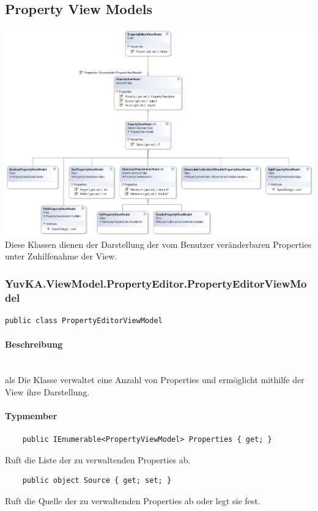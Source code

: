\subsection{Property View Models}


\includegraphics[width=\textwidth]{YuvKA.ViewModel.PropertyEditor/propertyEditor.png}
Diese Klassen dienen der Darstellung der vom Benutzer veränderbaren Properties unter Zuhilfenahme der View. 



\subsubsection{YuvKA.ViewModel.PropertyEditor.PropertyEditorViewModel}

\begin{verbatim}
public class PropertyEditorViewModel
\end{verbatim}

\paragraph{Beschreibung}~\\als
Die Klasse  verwaltet eine Anzahl von Properties und ermöglicht mithilfe der View ihre Darstellung.

\paragraph{Typmember}
\begin{itemize}

	\begin{verbatim}
	public IEnumerable<PropertyViewModel> Properties { get; }
	\end{verbatim}
	Ruft die Liste der zu verwaltenden Properties ab.

	\begin{verbatim}
	public object Source { get; set; }
	\end{verbatim}
	Ruft die Quelle der zu verwaltenden Properties ab oder legt sie fest.

\end{itemize}




